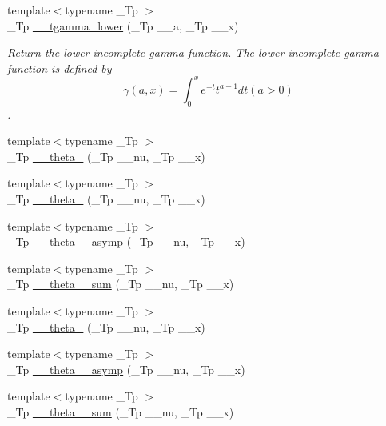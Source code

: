 \begin{DoxyCompactItemize}
{\footnotesize template$<$typename \+\_\+\+Tp $>$ }\\\+\_\+\+Tp \hyperlink{namespacestd_1_1____detail_ad85ad5ffdb1bab9b1e3b6fd7a114fb0d}{\+\_\+\+\_\+tgamma\+\_\+lower} (\+\_\+\+Tp \+\_\+\+\_\+a, \+\_\+\+Tp \+\_\+\+\_\+x)
\begin{DoxyCompactList}\small\item\em Return the lower incomplete gamma function. The lower incomplete gamma function is defined by \[ \gamma(a,x) = \int_0^x e^{-t}t^{a-1}dt (a > 0) \]. \end{DoxyCompactList}\item 
{\footnotesize template$<$typename \+\_\+\+Tp $>$ }\\\+\_\+\+Tp \hyperlink{namespacestd_1_1____detail_af7f54a82d2e5f0d8758cf53ebb2500e8}{\+\_\+\+\_\+theta\+\_} (\+\_\+\+Tp \+\_\+\+\_\+nu, \+\_\+\+Tp \+\_\+\+\_\+x)
\item 
{\footnotesize template$<$typename \+\_\+\+Tp $>$ }\\\+\_\+\+Tp \hyperlink{namespacestd_1_1____detail_ae783991fe49b94dff4ac9e3ebb446d4f}{\+\_\+\+\_\+theta\+\_} (\+\_\+\+Tp \+\_\+\+\_\+nu, \+\_\+\+Tp \+\_\+\+\_\+x)
\item 
{\footnotesize template$<$typename \+\_\+\+Tp $>$ }\\\+\_\+\+Tp \hyperlink{namespacestd_1_1____detail_ac7207ce23916e29df96b3b2159b55150}{\+\_\+\+\_\+theta\+\_\+\_\+asymp} (\+\_\+\+Tp \+\_\+\+\_\+nu, \+\_\+\+Tp \+\_\+\+\_\+x)
\item 
{\footnotesize template$<$typename \+\_\+\+Tp $>$ }\\\+\_\+\+Tp \hyperlink{namespacestd_1_1____detail_af434f6a07d92577f40f352aa3d44483c}{\+\_\+\+\_\+theta\+\_\+\_\+sum} (\+\_\+\+Tp \+\_\+\+\_\+nu, \+\_\+\+Tp \+\_\+\+\_\+x)
\item 
{\footnotesize template$<$typename \+\_\+\+Tp $>$ }\\\+\_\+\+Tp \hyperlink{namespacestd_1_1____detail_a6f965c639307555e5979b954a11ca0b8}{\+\_\+\+\_\+theta\+\_} (\+\_\+\+Tp \+\_\+\+\_\+nu, \+\_\+\+Tp \+\_\+\+\_\+x)
\item 
{\footnotesize template$<$typename \+\_\+\+Tp $>$ }\\\+\_\+\+Tp \hyperlink{namespacestd_1_1____detail_a975a9a52a8a483849dd0877c24ca5d74}{\+\_\+\+\_\+theta\+\_\+\_\+asymp} (\+\_\+\+Tp \+\_\+\+\_\+nu, \+\_\+\+Tp \+\_\+\+\_\+x)
\item 
{\footnotesize template$<$typename \+\_\+\+Tp $>$ }\\\+\_\+\+Tp \hyperlink{namespacestd_1_1____detail_a3dc1b5188464b81b6acbb2983ef0f77c}{\+\_\+\+\_\+theta\+\_\+\_\+sum} (\+\_\+\+Tp \+\_\+\+\_\+nu, \+\_\+\+Tp \+\_\+\+\_\+x)

\end{DoxyCompactItemize}
